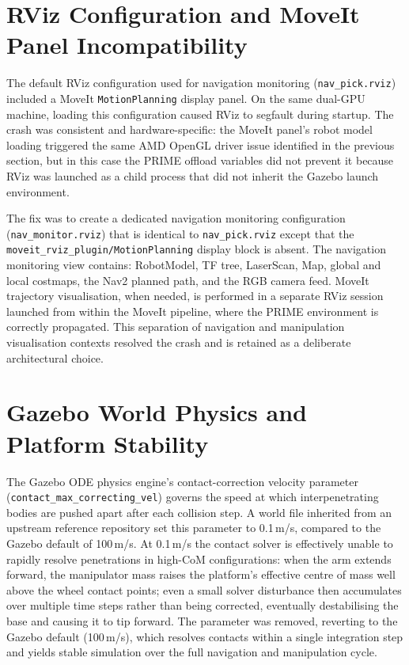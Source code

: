 \section{RViz Configuration and MoveIt Panel Incompatibility}
The default RViz configuration used for navigation monitoring (\texttt{nav\_pick.rviz})
included a MoveIt \texttt{MotionPlanning} display panel. On the same dual-GPU machine,
loading this configuration caused RViz to segfault during startup. The crash was
consistent and hardware-specific: the MoveIt panel's robot model loading triggered the
same AMD OpenGL driver issue identified in the previous section, but in this case the
PRIME offload variables did not prevent it because RViz was launched as a child process
that did not inherit the Gazebo launch environment.

The fix was to create a dedicated navigation monitoring configuration
(\texttt{nav\_monitor.rviz}) that is identical to \texttt{nav\_pick.rviz} except that
the \texttt{moveit\_rviz\_plugin/MotionPlanning} display block is absent. The navigation
monitoring view contains: RobotModel, TF tree, LaserScan, Map, global and local
costmaps, the Nav2 planned path, and the RGB camera feed. MoveIt trajectory
visualisation, when needed, is performed in a separate RViz session launched from within
the MoveIt pipeline, where the PRIME environment is correctly propagated. This separation
of navigation and manipulation visualisation contexts resolved the crash and is retained
as a deliberate architectural choice.

\section{Gazebo World Physics and Platform Stability}
The Gazebo ODE physics engine's contact-correction velocity parameter
(\texttt{contact\_max\_correcting\_vel}) governs the speed at which interpenetrating
bodies are pushed apart after each collision step. A world file inherited from an
upstream reference repository set this parameter to 0.1\,m/s, compared to the
Gazebo default of 100\,m/s. At 0.1\,m/s the contact solver is effectively unable
to rapidly resolve penetrations in high-CoM configurations: when the arm extends
forward, the manipulator mass raises the platform's effective centre of mass well
above the wheel contact points; even a small solver disturbance then accumulates over
multiple time steps rather than being corrected, eventually destabilising the base
and causing it to tip forward. The parameter was removed, reverting to the Gazebo
default (100\,m/s), which resolves contacts within a single integration step and
yields stable simulation over the full navigation and manipulation cycle.
